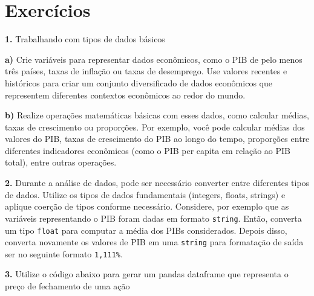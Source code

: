 \documentclass[
  portuguese,
  letterpaper,
  DIV=11,
  numbers=noendperiod]{scrreprt}
\theoremstyle{definition}
\theoremstyle{remark}
\begin{document}
\section{Exercícios}\label{exercuxedcios-3}

\textbf{1.} Trabalhando com tipos de dados básicos

\textbf{a)} Crie variáveis para representar dados econômicos, como o PIB
de pelo menos três países, taxas de inflação ou taxas de desemprego. Use
valores recentes e históricos para criar um conjunto diversificado de
dados econômicos que representem diferentes contextos econômicos ao
redor do mundo.

\textbf{b)} Realize operações matemáticas básicas com esses dados, como
calcular médias, taxas de crescimento ou proporções. Por exemplo, você
pode calcular médias dos valores do PIB, taxas de crescimento do PIB ao
longo do tempo, proporções entre diferentes indicadores econômicos (como
o PIB per capita em relação ao PIB total), entre outras operações.

\textbf{2.} Durante a análise de dados, pode ser necessário converter
entre diferentes tipos de dados. Utilize os tipos de dados fundamentais
(integers, floats, strings) e aplique coerção de tipos conforme
necessário. Considere, por exemplo que as variáveis representando o PIB
foram dadas em formato \texttt{string}. Então, converta um tipo
\texttt{float} para computar a média dos PIBs considerados. Depois
disso, converta novamente os valores de PIB em uma \texttt{string} para
formatação de saída ser no seguinte formato \texttt{1,111\%}.

\textbf{3.} Utilize o código abaixo para gerar um pandas dataframe que
representa o preço de fechamento de uma ação
\end{document}
